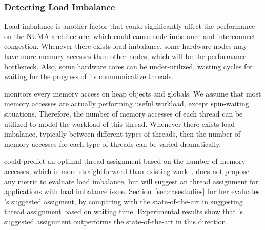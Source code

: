 \subsubsection{Detecting Load Imbalance}
Load imbalance is another factor that could significantly affect the performance on the NUMA architecture, which could cause node imbalance and interconnect congestion. Whenever there exists load imbalance, some hardware nodes may have more memory accesses than other nodes, which will be the performance bottleneck. Also, some hardware cores can be under-utilized, wasting cycles for waiting for the progress of its communicative threads. 

\NP{} monitors every memory access on heap objects and globals. We assume that most memory accesses are actually performing useful workload, except spin-waiting situations. Therefore,  the number of memory accesses of each thread can be utilized to model the workload of this thread. Whenever there exists load imbalance, typically between different types of threads, then the number of memory accesses for each type of threads can be varied dramatically. 

\NP{} could predict an optimal thread assignment based on the number of memory accesses, which is more straightforward than existing work~\cite{SyncPerf}. \NP{} does not propose any metric to evaluate load imbalance, but will suggest an thread assignment for applications with load imbalance issue. Section~\ref{sec:casestudies} further evaluates \NP{}'s suggested assigment, by comparing with the state-of-the-art in suggesting thread assignment based on waiting time. Experimental results show that \NP{}'s suggested assignment outperforms the state-of-the-art in this direction. 

